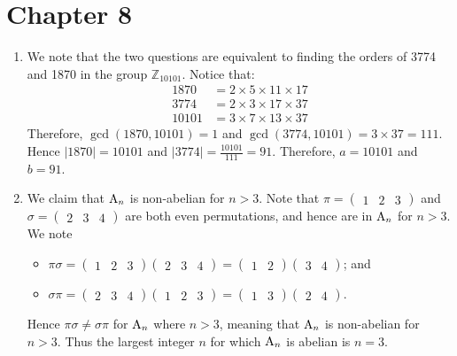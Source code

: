 \section*{Chapter 8}
\begin{enumerate}    
    \item We note that the two questions are equivalent to finding the orders of 3774 and 1870 in the group $\mathbb{Z}_{10101}$. Notice that:
    \begin{align*}
        1870 &= 2 \times 5 \times 11 \times 17\\
        3774 &= 2 \times 3 \times 17 \times 37\\
        10101 &= 3 \times 7 \times 13 \times 37
    \end{align*}
    Therefore, $\gcd(1870, 10101) = 1$ and $\gcd(3774, 10101) = 3 \times 37 = 111$. Hence $|1870| = 10101$ and $|3774| = \frac{10101}{111} = 91$. Therefore, $a = 10101$ and $b = 91$.

    \item We claim that $\mathrm{A}_{n}$ is non-abelian for $n > 3$. Note that $\pi = \begin{pmatrix}1 & 2 & 3\end{pmatrix}$ and $\sigma = \begin{pmatrix}2 & 3 & 4\end{pmatrix}$ are both even permutations, and hence are in $\mathrm{A}_{n}$ for $n > 3$. We note
    \begin{itemize}
        \item $\pi\sigma = \begin{pmatrix}1 & 2 & 3\end{pmatrix}\begin{pmatrix}2 & 3 & 4\end{pmatrix} = \begin{pmatrix}1 & 2\end{pmatrix}\begin{pmatrix}3 & 4\end{pmatrix}$; and
        \item $\sigma\pi = \begin{pmatrix}2 & 3 & 4\end{pmatrix}\begin{pmatrix}1 & 2 & 3\end{pmatrix} = \begin{pmatrix}1 & 3\end{pmatrix}\begin{pmatrix}2 & 4\end{pmatrix}$.
    \end{itemize}
    Hence $\pi\sigma \neq \sigma\pi$ for $\mathrm{A}_{n}$ where $n > 3$, meaning that $\mathrm{A}_{n}$ is non-abelian for $n > 3$. Thus the largest integer $n$ for which $\mathrm{A}_{n}$ is abelian is $n = 3$.
    

\end{enumerate}
